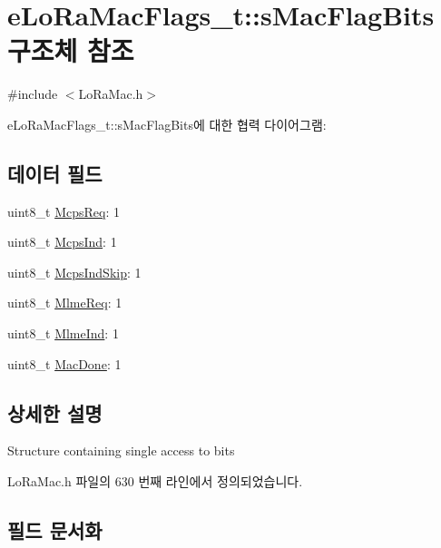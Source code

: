 \hypertarget{structe_lo_ra_mac_flags__t_1_1s_mac_flag_bits}{}\section{e\+Lo\+Ra\+Mac\+Flags\+\_\+t\+:\+:s\+Mac\+Flag\+Bits 구조체 참조}
\label{structe_lo_ra_mac_flags__t_1_1s_mac_flag_bits}


{\ttfamily \#include $<$Lo\+Ra\+Mac.\+h$>$}



e\+Lo\+Ra\+Mac\+Flags\+\_\+t\+:\+:s\+Mac\+Flag\+Bits에 대한 협력 다이어그램\+:
\subsection*{데이터 필드}
\begin{DoxyCompactItemize}
\item 
uint8\+\_\+t \mbox{\hyperlink{structe_lo_ra_mac_flags__t_1_1s_mac_flag_bits_adee8f234933a066317a08431f5db61b0}{Mcps\+Req}}\+: 1
\item 
uint8\+\_\+t \mbox{\hyperlink{structe_lo_ra_mac_flags__t_1_1s_mac_flag_bits_a81d24e4d487adef6c6d4f4ca0963319e}{Mcps\+Ind}}\+: 1
\item 
uint8\+\_\+t \mbox{\hyperlink{structe_lo_ra_mac_flags__t_1_1s_mac_flag_bits_a45141607ee2f47da2432d5d2a8045e69}{Mcps\+Ind\+Skip}}\+: 1
\item 
uint8\+\_\+t \mbox{\hyperlink{structe_lo_ra_mac_flags__t_1_1s_mac_flag_bits_a3743e193dca88e3913e44e993a209ebf}{Mlme\+Req}}\+: 1
\item 
uint8\+\_\+t \mbox{\hyperlink{structe_lo_ra_mac_flags__t_1_1s_mac_flag_bits_a201c052466c33d1e875325f0d0025e90}{Mlme\+Ind}}\+: 1
\item 
uint8\+\_\+t \mbox{\hyperlink{structe_lo_ra_mac_flags__t_1_1s_mac_flag_bits_a8b4a19cca2ba529046ea88bb13305407}{Mac\+Done}}\+: 1
\end{DoxyCompactItemize}


\subsection{상세한 설명}
Structure containing single access to bits 

Lo\+Ra\+Mac.\+h 파일의 630 번째 라인에서 정의되었습니다.



\subsection{필드 문서화}
\mbox{\label{structe_lo_ra_mac_flags__t_1_1s_mac_flag_bits_a8b4a19cca2ba529046ea88bb13305407}} 
